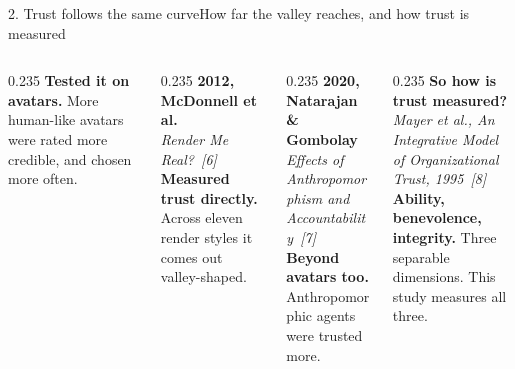 \documentclass[aspectratio=169,10pt]{beamer}
\newcommand{\hl}[1]{{\color{knblue}\textbf{#1}}}
\begin{document}
\begin{frame}{2. Trust follows the same curve}{How far the valley reaches, and how trust is measured}
\begin{columns}[T]
\begin{column}{0.235\textwidth}
      {\scriptsize \hl{Tested it on avatars.} More human-like avatars were rated more credible, and chosen more often.}
    \end{column}
    \begin{column}{0.235\textwidth}\centering
      {\scriptsize\bfseries 2012, McDonnell et al.}\\[0.25em]
      {\tiny\color{knblue}\itshape Render Me Real?~[6]}\\[0.3em]
      {\scriptsize \hl{Measured trust directly.} Across eleven render styles it comes out valley-shaped.}
    \end{column}
    \begin{column}{0.235\textwidth}\centering
      {\scriptsize\bfseries 2020, Natarajan \& Gombolay}\\[0.25em]
      {\tiny\color{knblue}\itshape Effects of Anthropomorphism and Accountability~[7]}\\[0.3em]
      {\scriptsize \hl{Beyond avatars too.} Anthropomorphic agents were trusted more.}
    \end{column}
    \begin{column}{0.235\textwidth}\centering
      {\scriptsize\bfseries\color{knblue} So how is trust measured?}\\[0.25em]
      {\tiny\color{knblue}\itshape Mayer et al., An Integrative Model of Organizational Trust, 1995~[8]}\\[0.3em]
      {\scriptsize \hl{Ability, benevolence, integrity.} Three separable dimensions. This study measures all three.}
    \end{column}
  \end{columns}
\end{frame}
\end{document}

